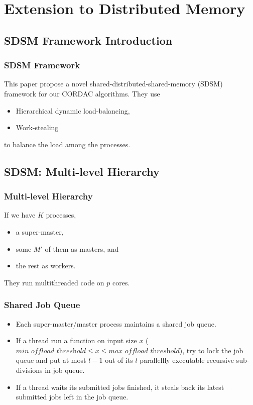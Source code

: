 \section{Extension to Distributed Memory}

\subsection{SDSM Framework Introduction}
\begin{frame}
    \frametitle{SDSM Framework}
    	This paper propose a novel shared-distributed-shared-memory (SDSM) 
    	framework for our CORDAC algorithms. They use
    \begin{itemize}
    	\item Hierarchical dynamic load-balancing,
    	\item Work-stealing
    \end{itemize}
     	to balance the load among the processes.
\end{frame}

\subsection{SDSM: Multi-level Hierarchy}
\begin{frame}
    \frametitle{Multi-level Hierarchy}
    If we have $K$ processes,
    \begin{itemize}
    	\item a super-master,
    	\item some $M'$ of them as masters, and
    	\item the rest as workers.
    \end{itemize}
    They run multithreaded code on $p$ cores.
\end{frame}

\begin{frame}
    \frametitle{Shared Job Queue}
    \begin{itemize}
    	\item Each super-master/master process maintains a shared 
    		job queue.
    	\item If a thread run a function on input size $x$ 
    		($\textit{min offload threshold} \le x \le \textit{max offload threshold}$), 
    		try to lock the job queue and put at most $l-1$
    		out of its $l$ parallellly executable recursive sub-divisions in job queue.
    	\item If a thread waits its submitted jobs finished,
    		it steals back its latest submitted jobs left in the job queue.
    \end{itemize}
\end{frame}

